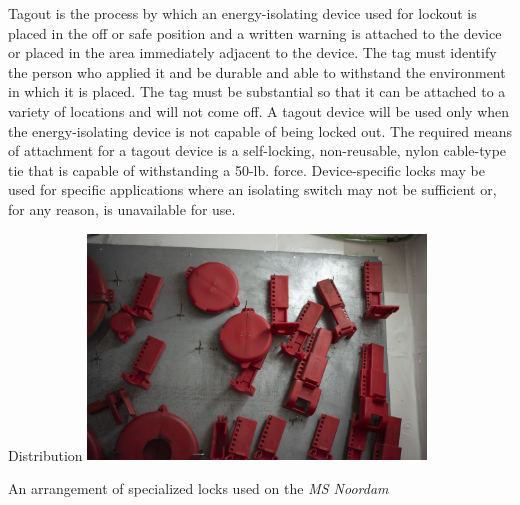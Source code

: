 \documentclass[11pt,a4paper]{article}
\begin{document}
Tagout is the process by which an energy-isolating device used for lockout is placed in the off or safe position and a written warning is attached to the device or placed in the area immediately adjacent to the device. The tag must identify the person who applied it and be durable and able to withstand the environment in which it is placed. The tag must be substantial so that it can be attached to a variety of locations and will not come off. A tagout device will be used only when the energy-isolating device is not capable of being locked out. The required means of attachment for a tagout device is a self-locking, non-reusable, nylon cable-type tie that is capable of withstanding a 50-lb. force.\cite{ucsb}
Device-specific locks may be used for specific applications where an isolating switch may not be sufficient or, for any reason, is unavailable for use.
\begin{center}Distribution
  \includegraphics[width=9cm]{lotowall.jpg}\par
  An arrangement of specialized locks used on the \textit{MS Noordam}
  \end{center}
\end{document}
